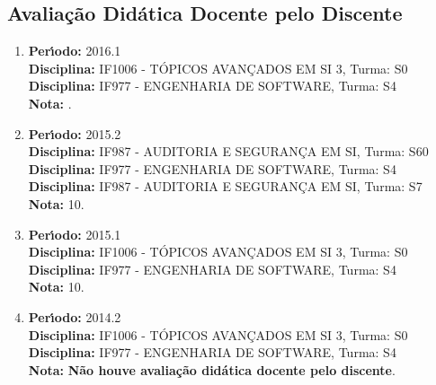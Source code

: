 \subsection{Avalia\c{c}\~{a}o Did\'{a}tica Docente pelo Discente}
\vspace{0.3cm}

\begin{enumerate}
\renewcommand{\labelenumi}{{\large\bfseries\arabic{enumi}.}}

\item   \textbf{Per\'{\i}odo:} 2016.1 \\
        \textbf{Disciplina:} IF1006 - T\'{O}PICOS AVAN\c{C}ADOS EM SI 3, Turma: S0\\
        \textbf{Disciplina:} IF977 - ENGENHARIA DE SOFTWARE, Turma: S4\\
        \textbf{Nota:} .

\item   \textbf{Per\'{\i}odo:} 2015.2 \\
        \textbf{Disciplina:} IF987 - AUDITORIA E SEGURAN\c{C}A EM SI, Turma: S60\\
        \textbf{Disciplina:} IF977 - ENGENHARIA DE SOFTWARE, Turma: S4\\
        \textbf{Disciplina:} IF987 - AUDITORIA E SEGURAN\c{C}A EM SI, Turma: S7\\
        \textbf{Nota:} 10.

\item   \textbf{Per\'{\i}odo:} 2015.1 \\
        \textbf{Disciplina:} IF1006 - T\'{O}PICOS AVAN\c{C}ADOS EM SI 3, Turma: S0\\
        \textbf{Disciplina:} IF977 - ENGENHARIA DE SOFTWARE, Turma: S4\\
        \textbf{Nota:} 10.

\item   \textbf{Per\'{\i}odo:} 2014.2 \\
        \textbf{Disciplina:} IF1006 - T\'{O}PICOS AVAN\c{C}ADOS EM SI 3, Turma: S0\\
        \textbf{Disciplina:} IF977 - ENGENHARIA DE SOFTWARE, Turma: S4\\
        \textbf{Nota:} \textbf{N\~{a}o houve avalia\c{c}\~{a}o did\'{a}tica docente pelo discente}.

\end{enumerate}